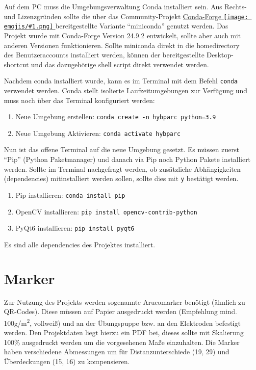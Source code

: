 \documentclass[a4paper, 10pt]{article}
\newcommand{\code}[1]{\texttt{#1}}
\newcommand{\emoji}[1]{
    \begingroup\normalfont
    \texttt{[image: emojis/\#1.png]}
    \endgroup
}
\begin{document}
Auf dem PC muss die Umgebungsverwaltung Conda installiert sein. Aus Rechts- und Lizenzgründen sollte die über das Community-Projekt \href{https://conda-forge.org/}{Conda-Forge\emoji{link}} bereitgestellte Variante \enquote{miniconda} genutzt werden. Das Projekt wurde mit Conda-Forge Version 24.9.2 entwickelt, sollte aber auch mit anderen Versionen funktionieren. Sollte miniconda direkt in die homedirectory des Benutzeraccounts installiert werden, können der bereitgestellte Desktop-shortcut und das dazugehörige shell script direkt verwendet werden.

Nachdem conda installiert wurde, kann es im Terminal mit dem Befehl \code{conda} verwendet werden. Conda stellt isolierte Laufzeitumgebungen zur Verfügung und muss noch über das Terminal konfiguriert werden:
\begin{enumerate}
    \item Neue Umgebung erstellen: \code{conda create -n hybparc python=3.9}
    \item Neue Umgebung Aktivieren: \code{conda activate hybparc}
\end{enumerate}

\noindent Nun ist das offene Terminal auf die neue Umgebung gesetzt. Es müssen zuerst \enquote{Pip} (Python Paketmanager) und danach via Pip noch Python Pakete installiert werden. Sollte im Terminal nachgefragt werden, ob zusätzliche Abhängigkeiten (dependencies) mitinstalliert werden sollen, sollte dies mit \code{y} bestätigt werden.

\begin{enumerate}
    \item Pip installieren: \code{conda install pip}
    \item OpenCV installieren: \code{pip install opencv-contrib-python}
    \item PyQt6 installieren: \code{pip install pyqt6}
\end{enumerate}

Es sind alle dependencies des Projektes installiert.

\section{Marker}
\label{sec:ref-markers}
Zur Nutzung des Projekts werden sogenannte Arucomarker benötigt (ähnlich zu QR-Codes). Diese müssen auf Papier ausgedruckt werden (Empfehlung mind. 100g/m\textsuperscript{2}, vollweiß) und an der Übungspuppe bzw. an den Elektroden befestigt werden. Den Projektdaten liegt hierzu ein PDF bei, dieses sollte mit Skalierung 100\% ausgedruckt werden um die vorgesehenen Maße einzuhalten. Die Marker haben verschiedene Abmessungen um für Distanzunterschiede (19, 29) und Überdeckungen (15, 16) zu kompensieren.
\end{document}
